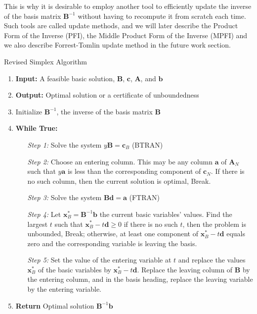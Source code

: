 This is why it is desirable to employ another tool to efficiently
update the inverse of the basis matrix $\mathbf{B}^{-1}$
without having to recompute it from scratch each time.
Such tools are called update methods,
and we will later describe the Product Form of the Inverse (PFI),
the Middle Product Form of the Inverse (MPFI) and we also describe Forrest-Tomlin update method
in the future work section.

\begin{algorithm}
    \caption{Revised Simplex Algorithm \parencite{chvatal1983linear}}
    \begin{enumerate}
        \item \textbf{Input:} A feasible basic solution, \( \mathbf{B} \), \( \mathbf{c} \), \( \mathbf{A} \), and \( \mathbf{b} \)
        \item \textbf{Output:} Optimal solution or a certificate of unboundedness
        \item Initialize \( \mathbf{B}^{-1} \), the inverse of the basis matrix \( \mathbf{B} \)
        \item \textbf{While True:}
              \begin{itemize}
                  \setlength{\itemindent}{3em}
                  \item[\textit{Step 1:}] Solve the system \( y\mathbf{B} = \mathbf{c}_B \) (BTRAN)
                  \item[\textit{Step 2:}] Choose an entering column. This may be any column $\mathbf{a}$  of
                      \( \mathbf{A}_N \) such that \( y\mathbf{a} \) is less than the corresponding component
                      of \( \mathbf{c}_N \). If there is no such column, then the current solution is optimal, Break.
                  \item[\textit{Step 3:}] Solve the system \( \mathbf{B}\mathbf{d} = \mathbf{a} \) (FTRAN)
                  \item[\textit{Step 4:}] Let \( \mathbf{x}_B^{\ast} = \mathbf{B}^{-1}\mathbf{b} \) the current basic variables' values.
                      Find the largest \( t \) such that \( \mathbf{x}_B^{\ast} - t\mathbf{d} \geq 0\)
                      if there is no such \( t \), then the problem is unbounded, Break; otherwise, at least
                      one component of  \( \mathbf{x}_B^{\ast} - t\mathbf{d} \) equals zero and the corresponding variable is leaving the basis.
                  \item[\textit{Step 5:}] Set the value of the entering variable at
                      \( t \) and replace the values \( \mathbf{x}_B^{\ast} \) of the basic variables by \( \mathbf{x}_B^{\ast} - t\mathbf{d} \).
                      Replace the leaving column of \( \mathbf{B} \) by the entering column, and in the basis heading,
                      replace the leaving variable by the entering variable.
              \end{itemize}

        \item \textbf{Return} Optimal solution \( \mathbf{B}^{-1}\mathbf{b} \)
    \end{enumerate}
    \label{algo:revised}
\end{algorithm}


